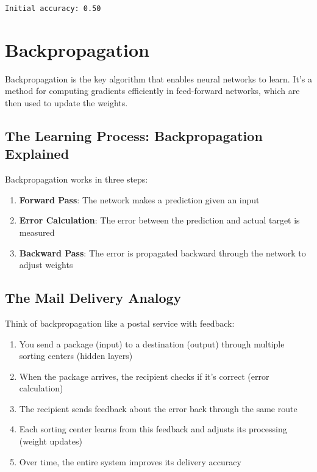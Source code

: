 \documentclass[
  letterpaper,
  DIV=11,
  numbers=noendperiod]{scrreprt}
\providecommand{\tightlist}{%
  \setlength{\itemsep}{0pt}\setlength{\parskip}{0pt}}\usepackage{longtable,booktabs,array}
\begin{document}
\begin{verbatim}
Initial accuracy: 0.50
\end{verbatim}

\section{Backpropagation}\label{backpropagation}

Backpropagation is the key algorithm that enables neural networks to
learn. It's a method for computing gradients efficiently in feed-forward
networks, which are then used to update the weights.

\subsection{The Learning Process: Backpropagation
Explained}\label{the-learning-process-backpropagation-explained}

Backpropagation works in three steps:

\begin{enumerate}
\def\labelenumi{\arabic{enumi}.}
\tightlist
\item
  \textbf{Forward Pass}: The network makes a prediction given an input
\item
  \textbf{Error Calculation}: The error between the prediction and
  actual target is measured
\item
  \textbf{Backward Pass}: The error is propagated backward through the
  network to adjust weights
\end{enumerate}

\subsection{The Mail Delivery Analogy}\label{the-mail-delivery-analogy}

Think of backpropagation like a postal service with feedback:

\begin{enumerate}
\def\labelenumi{\arabic{enumi}.}
\tightlist
\item
  You send a package (input) to a destination (output) through multiple
  sorting centers (hidden layers)
\item
  When the package arrives, the recipient checks if it's correct (error
  calculation)
\item
  The recipient sends feedback about the error back through the same
  route
\item
  Each sorting center learns from this feedback and adjusts its
  processing (weight updates)
\item
  Over time, the entire system improves its delivery accuracy
\end{enumerate}
\end{document}
